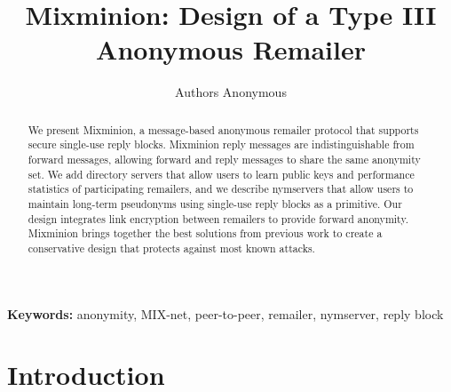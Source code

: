 \documentclass{llncs}
\newcommand\emailaddr{\begingroup \def\UrlLeft{<}\def\UrlRight{>}\urlstyle{tt}\Url}
\begin{document}

\title{Mixminion: Design of a Type III Anonymous Remailer}

% 
\author{Authors Anonymous}
\institute{}


\maketitle
\pagestyle{plain} 
  
\begin{abstract}

We present Mixminion, a message-based anonymous remailer protocol that
supports secure single-use reply blocks. Mixminion reply messages are
indistinguishable from forward messages, allowing forward and reply
messages to share
the same anonymity set. We add directory servers that allow users to
learn public keys and performance statistics of participating remailers,
and we describe nymservers that allow users to maintain long-term
pseudonyms using single-use reply blocks as a primitive. Our design
integrates link encryption between remailers to provide
forward anonymity. Mixminion brings together the best solutions from
previous work to create a conservative design that protects against most
known attacks.


\end{abstract}

\noindent \textbf{Keywords:} anonymity, MIX-net, peer-to-peer, remailer, nymserver, reply block


\section{Introduction}
\label{sec:intro}
\end{document}
